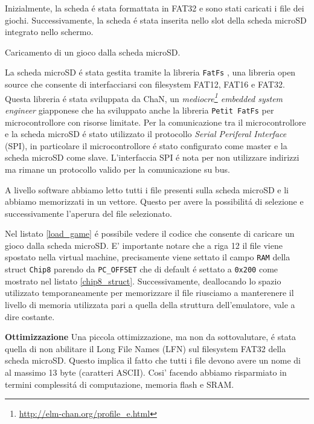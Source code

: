\documentclass[a4paper]{article}
\begin{document}
Inizialmente, la scheda é stata formattata in FAT32 e sono stati caricati i file dei giochi. Successivamente, la scheda é stata inserita nello slot della scheda microSD integrato nello schermo.

\begin{Listing}[h!t] %
    \centering
    \caption{Caricamento di un gioco dalla scheda microSD.}
    \label{load_game}
\end{Listing}

La scheda microSD é stata gestita tramite la libreria \texttt{FatFs} \cite{elm-chan:fatfs}, una libreria open source che consente di interfacciarsi con filesystem FAT12, FAT16 e FAT32. Questa libreria é stata sviluppata da ChaN, un \textit{mediocre\footnote{\url{http://elm-chan.org/profile_e.html}} embedded system engineer} giapponese che ha sviluppato anche la libreria \texttt{Petit FatFs} per microcontrollore con risorse limitate.
Per la comunicazione tra il microcontrollore e la scheda microSD é stato utilizzato il protocollo \textit{Serial Periferal Interface} (SPI), in particolare il microcontrollore é stato configurato come master e la scheda microSD come slave. L'interfaccia SPI é nota per non utilizzare indirizzi ma rimane un protocollo valido per la comunicazione su bus.

A livello software abbiamo letto tutti i file presenti sulla scheda microSD e li abbiamo memorizzati in un vettore. Questo per avere la possibilitá di selezione e successivamente l'aperura del file selezionato.

Nel listato \ref{load_game} é possibile vedere il codice che consente di caricare un gioco dalla scheda microSD. E' importante notare che a riga 12 il file viene spostato nella virtual machine, precisamente viene settato il campo \texttt{RAM} della struct \texttt{Chip8} parendo da \texttt{PC\_OFFSET} che di default é settato a \texttt{0x200} come mostrato nel listato \ref{chip8_struct}. Successivamente, deallocando lo spazio utilizzato temporaneamente per memorizzare il file riusciamo a manterenere il livello di memoria utilizzata pari a quella della struttura dell'emulatore, vale a dire costante.

\textbf{Ottimizzazione} \quad  Una piccola ottimizzazione, ma non da sottovalutare, é stata quella di non abilitare il Long File Names (LFN) sul filesystem FAT32 della scheda microSD. Questo implica il fatto che tutti i file devono avere un nome di al massimo 13 byte (caratteri ASCII). Cosi' facendo abbiamo risparmiato in termini complessitá di computazione, memoria flash e SRAM.
\end{document}
